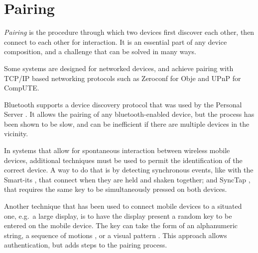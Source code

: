 %

\section{Pairing}
\label{sec:rwpairing}

\emph{Pairing} is the procedure through which two devices first discover each other, then connect to each other for interaction.
It is an essential part of any device composition, and a challenge that can be solved in many ways.

Some systems are designed for networked devices, and achieve pairing with TCP/IP based networking protocols such as Zeroconf \citeyearpar{zeroconf} for Obje and UPnP \citeyearpar{upnp} for CompUTE.

Bluetooth \citeyearpar{bluetooth} supports a device discovery protocol that was used by the Personal Server \citep{Want:2002:personalserver}.
It allows the pairing of any bluetooth-enabled device, but the process has been shown to be slow, and can be inefficient if there are multiple devices in the vicinity.

In systems that allow for spontaneous interaction between wireless mobile devices, additional techniques must be used to permit the identification of the correct device.
A way to do that is by detecting synchronous events, like with the Smart-its \citep{Holmquist:2001:smartits}, that connect when they are held and shaken together; and SyncTap \citep{Rekimoto:2003:synctap}, that requires the same key to be simultaneously pressed on both devices.

Another technique that has been used to connect mobile devices to a situated one, e.g.\ a large display, is to have the display present a random key to be entered on the mobile device.
The key can take the form of an alphanumeric string, a sequence of motions \citep{Patel:2004:mobileauth}, or a visual pattern \citep{Ballagas:2005:sweeppointshoot, Scott:2005:visualauth}.
This approach allows authentication, but adds steps to the pairing process.

